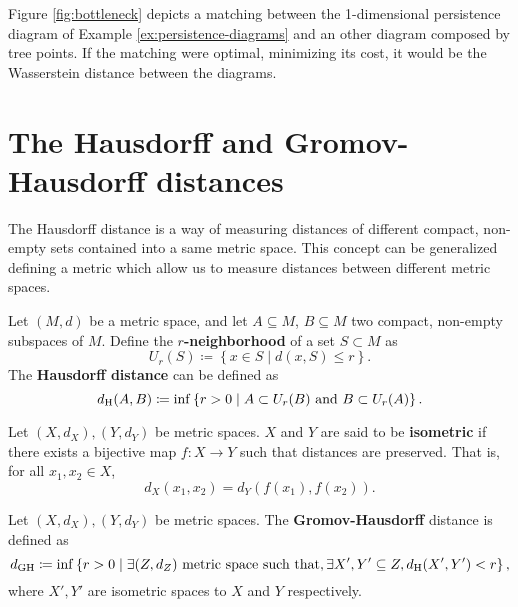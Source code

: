 \begin{example} \label{ex:wasserstein}
    Figure \ref{fig:bottleneck} depicts a matching between the 1-dimensional persistence diagram of Example \ref{ex:persistence-diagrams} and an other diagram composed by tree points. If the matching were optimal, minimizing its cost, it would be the Wasserstein distance between the diagrams.
    
\end{example}

\section{The Hausdorff and Gromov-Hausdorff distances} \label{sec:preliminaries-hausdorff}

The Hausdorff distance is a way of measuring distances of different compact, non-empty sets contained into a same metric space. This concept can be generalized defining a metric which allow us to measure distances between different metric spaces.

\begin{definition} \label{def:hausdorff-distance}
    Let $ (M, d) $ be a metric space, and let $ A \subseteq M $, $ B \subseteq M $ two compact, non-empty subspaces of $ M $. Define the {\bf $r$-neighborhood} of a set $ S \subset M $ as
    \begin{equation}
        U_r(S) \coloneq \left\{ x \in S \mid d(x, S) \leq r \right\}.
    \end{equation}
    The {\bf Hausdorff distance} can be defined as
    \begin{equation}
        d_{\operatorname{H}}(A, B) \coloneq \inf \left\{ r > 0 \mid A \subset U_r(B) \text{ and } B \subset U_r(A) \right\}.
    \end{equation}
\end{definition}

\begin{definition}
    Let $ (X, d_X), (Y, d_Y) $ be metric spaces. $ X $ and $ Y $ are said to be {\bf isometric} if there exists a bijective map $ f: X \to Y $ such that distances are preserved. That is, for all $ x_1, x_2 \in X $,
    $$
        d_X(x_1, x_2) = d_Y(f(x_1), f(x_2)).
    $$
\end{definition}

\begin{definition} \label{def:dgh}
    Let $ (X, d_X), (Y, d_Y) $ be metric spaces. The {\bf Gromov-Hausdorff} distance is defined as
    \begin{equation}
        d_{\operatorname{GH}} \coloneq \inf \left\{ r > 0 \mid \exists (Z, d_Z) \text{ metric space such that}, \exists X', Y' \subseteq Z, d_{\operatorname{H}}(X', Y') < r \right\},
    \end{equation}
    where $ X', Y' $ are isometric spaces to $ X $ and $ Y $ respectively.
\end{definition}

